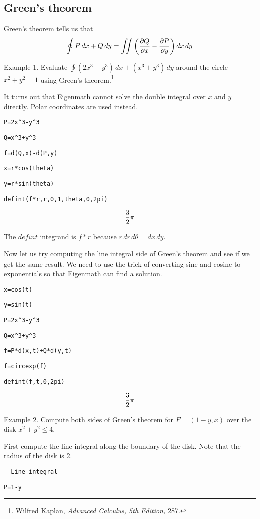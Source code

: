 \subsection{Green's theorem}
Green's theorem tells us that
$$\oint P\,dx+Q\,dy=\int\!\!\!\int
\left({\partial Q\over\partial x}-{\partial P\over\partial y}\right)
dx\,dy$$

\medskip
\noindent
Example 1.
Evaluate $\oint (2x^3-y^3)\,dx+(x^3+y^3)\,dy$ around the circle
$x^2+y^2=1$ using Green's theorem.\footnote{
Wilfred Kaplan, {\it Advanced Calculus, 5th Edition,} 287.}

\medskip
\noindent
It turns out that Eigenmath cannot solve the double integral over
$x$ and $y$ directly.
Polar coordinates are used instead.

\medskip
\verb$P=2x^3-y^3$

\verb$Q=x^3+y^3$

\verb$f=d(Q,x)-d(P,y)$

\verb$x=r*cos(theta)$

\verb$y=r*sin(theta)$

\verb$defint(f*r,r,0,1,theta,0,2pi)$

$${3\over2}\pi$$

\medskip
\noindent
The $defint$ integrand is $f{*}r$ because $r\,dr\,d\theta=dx\,dy$.

\medskip
\noindent
Now let us try computing the line integral side of Green's theorem
and see if we get the same result.
We need to use the trick of converting sine and cosine to exponentials
so that Eigenmath can find a solution.

\medskip
\verb$x=cos(t)$

\verb$y=sin(t)$

\verb$P=2x^3-y^3$

\verb$Q=x^3+y^3$

\verb$f=P*d(x,t)+Q*d(y,t)$

\verb$f=circexp(f)$

\verb$defint(f,t,0,2pi)$

$${3\over2}\pi$$

\newpage

\noindent
Example 2.
Compute both sides of Green's theorem for
$F=(1-y,x)$ over the disk $x^2+y^2\le4$.

\medskip
\noindent
First compute the line integral along the boundary of the disk.
Note that the radius of the disk is 2.

\medskip
\verb$--Line integral$

\verb$P=1-y$

